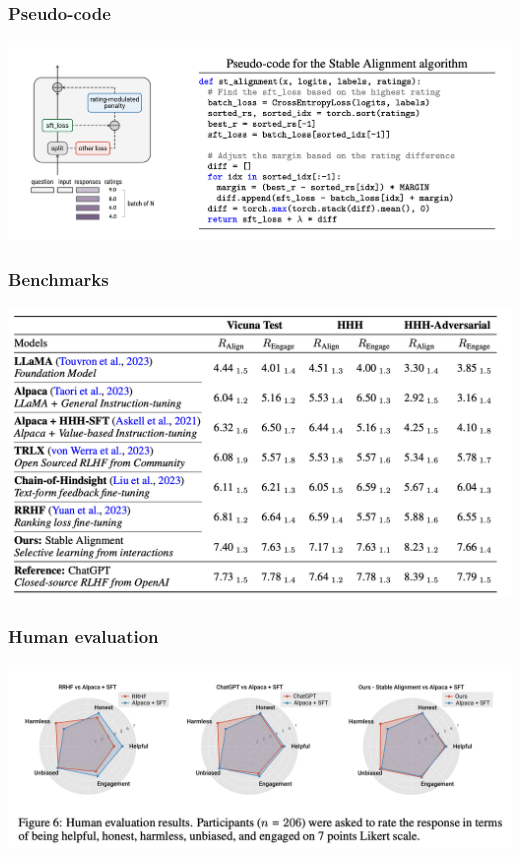 \documentclass[xcolor=dvipsnames]{beamer}
\newcommand{\0}{\vec{0}}
\begin{document}
		\begin{frame}
			\frametitle{Pseudo-code}
			\begin{center}
				\includegraphics[width=\textwidth]{Liu2}
			\end{center}
		\end{frame}
		\begin{frame}
			\frametitle{Benchmarks}
			\begin{center}
				\includegraphics[width=\textwidth]{Liu3}
			\end{center}
		\end{frame}
		\begin{frame}
			\frametitle{Human evaluation}
			\begin{center}
				\includegraphics[width=\textwidth]{Liu4}
			\end{center}
		\end{frame}
		
\end{document}
